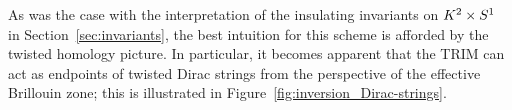 As was the case with the interpretation of the insulating invariants on $K^2\times S^1$ in Section~\ref{sec:invariants}, the best intuition for this scheme is afforded by the twisted homology picture. In particular, it becomes apparent that the TRIM can act as endpoints of twisted Dirac strings from the perspective of the effective Brillouin zone; this is illustrated in Figure~\ref{fig:inversion_Dirac-strings}.
\begin{figure}[htb!]
	\centering
	\hfil
	\hfil

\end{figure}
